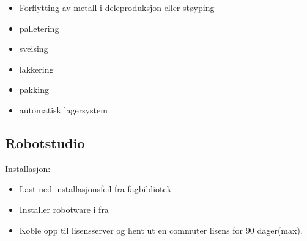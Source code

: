 \begin{itemize}[noitemsep]
\item Forflytting av metall i deleproduksjon eller støyping
\item palletering
\item sveising
\item lakkering
\item pakking
\item automatisk lagersystem
\end{itemize}
\vfil  \eject
\subsection{Robotstudio}

Installasjon:
\begin{itemize}[noitemsep]
	\item Last ned installasjonsfeil fra fagbibliotek
	\item Installer robotware i fra
	\item Koble opp til lisensserver og hent ut en commuter lisens for 90 dager(max).
\end{itemize}
